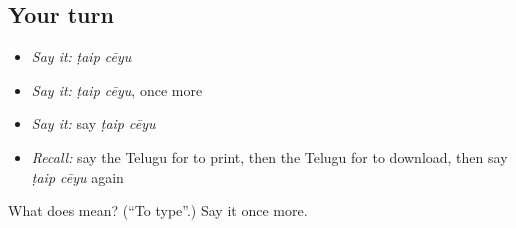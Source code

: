 \subsection*{Your turn}
\begin{itemize}
\raggedright
  \item \emph{Say it:} \emph{ṭaip cēyu}
  \item \emph{Say it:} \emph{ṭaip cēyu}, once more
  \item \emph{Say it:} say \emph{ṭaip cēyu}
  \item \emph{Recall:} say the Telugu for to print, then the Telugu for to download, then say \emph{ṭaip cēyu} again
\end{itemize}

\begin{tcolorbox}[breakable,colback=teal!4,colframe=teal!35!black,title={Before you move on}]
What does   mean? (\textquotedblleft{}To type\textquotedblright{}.) Say it once more.
\end{tcolorbox}
